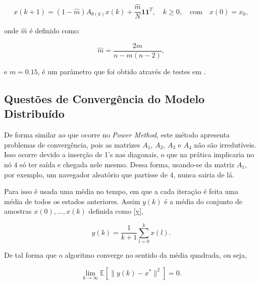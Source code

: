 \begin{equation} \label{Ax}
x(k+1) = (1 - \hat{m})A_{\theta(k)}x(k) + \frac{\hat{m}}{N} \textbf{11}^T, \quad k \geq 0, \quad \text{com} \quad x(0) = x_0,
\end{equation}

\noindent onde $\hat{m}$ é definido como: 

\begin{equation}\label{m}
\hat{m} = \frac{2m}{n-m(n-2)},
\end{equation}

\noindent e $m = 0.15$, é um parâmetro que foi obtido através de testes em \cite{zaki2012detection}.    

\subsection{Questões de Convergência do Modelo Distribuído}%

De forma similar ao que ocorre no \textit{Power Method}, este método apresenta problemas de convergência, pois as matrizes $A_1$, $A_2$, $A_3$ e $A_4$ não são irredutíveis. Isso ocorre devido a inserção de 1's nas diagonais, o que na prática implicaria no nó $4$ só ter saída e chegada nele mesmo. Dessa forma, usando-se da matriz $A_1$, por exemplo, um navegador aleatório que partisse de $4$, nunca sairia de lá.

Para isso é usada uma média no tempo, em que a cada iteração é feita uma média de todos os estados anteriores. Assim $y(k)$ é a média do conjunto de amostras $x(0),... , x(k)$ definida como \eqref{y}, 

\begin{equation}\label{y}
y(k) = \frac{1}{k+1} \sum_{l=0}^{k} x(l).
\end{equation}


\noindent De tal forma que o algoritmo converge no sentido da média quadrada, ou seja,

\begin{equation}\label{E}
\lim_{k\rightarrow \infty} \mathbb{E} [\parallel y(k)-x^*\parallel^2] = 0.
\end{equation}

